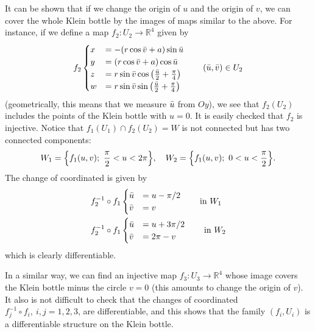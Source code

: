 \documentclass[../main.tex]{subfiles}
\begin{document}
\begin{exercise}
It can be shown that if we change the origin of $u$ and the origin of $v$, we can cover the whole Klein bottle by the images of maps similar to the above. For instance, if we define a map $f_2:U_2\to \mathbb{R}^4$ given by
\[
f_2
\begin{cases}
x&= -(r\cos\Bar{v}+a)\sin\Bar{u}\\
y&=(r\cos\Bar{v}+a)\cos\Bar{u}\\
z&=r\sin\Bar{v}\cos\left(\frac{\Bar{u}}{2}+\frac{\pi}{4}\right)\\
w&= r\sin\Bar{v}\sin{\left(\frac{\Bar{u}}{2}+\frac{\pi}{4}\right)}
\end{cases}
\qquad (\Bar{u},\Bar{v})\in U_2
\]
(geometrically, this means that we measure $\Bar{u}$ from $Oy$), we see that $f_2(U_2)$ includes the points of the Klein bottle with $u=0$. It is easily checked that $f_2$ is injective. Notice that $f_1(U_1)\cap f_2(U_2)=W$ is not connected but has two connected components:
\[
W_1=\Bqty{f_1(u,v);\ \frac{\pi}{2}<u<2\pi}, \quad W_2=\Bqty{f_1(u,v); \ 0 < u <\frac{\pi}{2}}.
\]
The change of coordinated is given by
\[
\begin{split}
    f_2^{-1}\circ f_1 &
    \begin{cases}
    \Bar{u}&= u-\pi/2\\
    \Bar{v}&=v
    \end{cases}
    \qquad \textrm{in } W_1\\
    f_2^{-1}\circ f_1 &
    \begin{cases}
    \Bar{u}&= u+3\pi/2\\
    \Bar{v}&=2\pi-v
    \end{cases}
    \qquad \textrm{in }W_2
\end{split}
\]
which is clearly differentiable.

In a similar way, we can find an injective map $f_3:U_3\to\mathbb{R}^4$ whose image covers the Klein bottle minus the circle $v=0$ (this amounts to change the origin of $v$). It also is not difficult to check that the changes of coordinated $f_j^{-1}\circ f_i, \ i,j=1,2,3$, are differentiable, and this shows that the family $(f_i, U_i)$ is a differentiable structure on the Klein bottle. 
\end{exercise}
\end{document}
